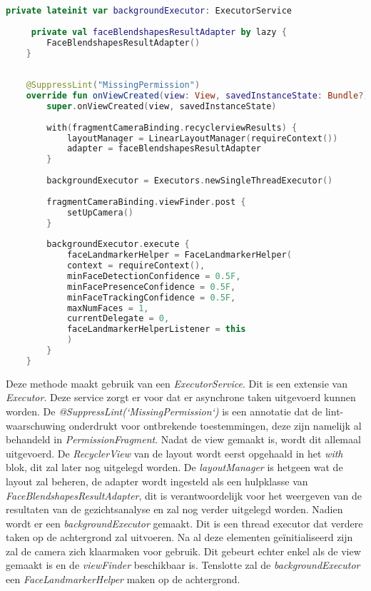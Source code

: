 \begin{lstlisting}[language=Kotlin, caption=onViewCreated in CameraFragment.kt]
    private lateinit var backgroundExecutor: ExecutorService
    
     private val faceBlendshapesResultAdapter by lazy {
        FaceBlendshapesResultAdapter()
    }
    
    
    @SuppressLint("MissingPermission")
    override fun onViewCreated(view: View, savedInstanceState: Bundle?) {
        super.onViewCreated(view, savedInstanceState)
        
        with(fragmentCameraBinding.recyclerviewResults) {
            layoutManager = LinearLayoutManager(requireContext())
            adapter = faceBlendshapesResultAdapter
        }
        
        backgroundExecutor = Executors.newSingleThreadExecutor()
        
        fragmentCameraBinding.viewFinder.post {
            setUpCamera()
        }
        
        backgroundExecutor.execute {
            faceLandmarkerHelper = FaceLandmarkerHelper(
            context = requireContext(),
            minFaceDetectionConfidence = 0.5F,
            minFacePresenceConfidence = 0.5F,
            minFaceTrackingConfidence = 0.5F,
            maxNumFaces = 1,
            currentDelegate = 0,
            faceLandmarkerHelperListener = this
            )
        }
    }
\end{lstlisting}
Deze methode maakt gebruik van een \emph{ExecutorService}. Dit is een extensie van \emph{Executor}. Deze service zorgt er voor dat er asynchrone taken uitgevoerd kunnen worden. De \emph{@SuppressLint(`MissingPermission`)} is een annotatie dat de lint-waarschuwing onderdrukt voor ontbrekende toestemmingen, deze zijn namelijk al behandeld in \emph{PermissionFragment}. Nadat de view gemaakt is, wordt dit allemaal uitgevoerd. De \emph{RecyclerView} van de layout wordt eerst opgehaald in het \emph{with} blok, dit zal later nog uitgelegd worden. De \emph{layoutManager} is hetgeen wat de layout zal beheren, de adapter wordt ingesteld als een hulpklasse van \emph{FaceBlendshapesResultAdapter}, dit is verantwoordelijk voor het weergeven van de resultaten van de gezichtsanalyse en zal nog verder uitgelegd worden. Nadien wordt er een \emph{backgroundExecutor} gemaakt. Dit is een thread executor dat verdere taken op de achtergrond zal uitvoeren. Na al deze elementen geïnitialiseerd zijn zal de camera zich klaarmaken voor gebruik. Dit gebeurt echter enkel als de view gemaakt is en de \emph{viewFinder} beschikbaar is. Tenslotte zal de \emph{backgroundExecutor} een \emph{FaceLandmarkerHelper} maken op de achtergrond.

